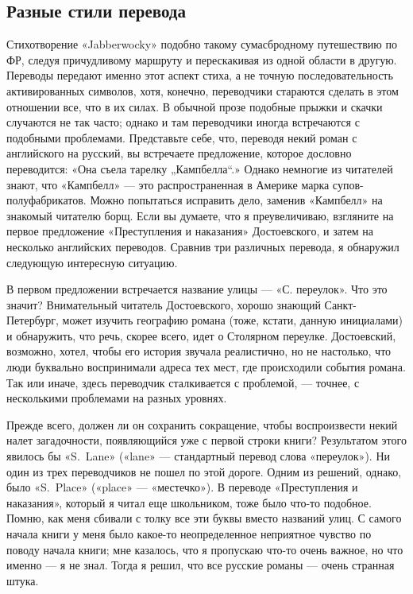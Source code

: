 \documentclass[../main.tex]{subfiles}
\begin{document}
\subsection{Разные стили перевода}

Стихотворение «Jabberwocky» подобно такому сумасбродному путешествию по ФР, следуя причудливому маршруту и перескакивая из одной области в другую. Переводы передают именно этот аспект стиха, а не точную последовательность активированных символов, хотя, конечно, переводчики стараются сделать в этом отношении все, что в их силах. В обычной прозе подобные прыжки и скачки случаются не так часто; однако и там переводчики иногда встречаются с подобными проблемами. Представьте себе, что, переводя некий роман с английского на русский, вы встречаете предложение, которое дословно переводится: «Она съела тарелку „Кампбелла``.» Однако немногие из читателей знают, что «Кампбелл» --- это распространенная в Америке марка супов-полуфабрикатов. Можно попытаться исправить дело, заменив «Кампбелл» на знакомый читателю борщ. Если вы думаете, что я преувеличиваю, взгляните на первое предложение «Преступления и наказания» Достоевского, и затем на несколько английских переводов. Сравнив три различных перевода, я обнаружил следующую интересную ситуацию.

В первом предложении встречается название улицы --- «С. переулок». Что это значит? Внимательный читатель Достоевского, хорошо знающий Санкт-Петербург, может изучить географию романа (тоже, кстати, данную инициалами) и обнаружить, что речь, скорее всего, идет о Столярном переулке. Достоевский, возможно, хотел, чтобы его история звучала реалистично, но не настолько, что люди буквально воспринимали адреса тех мест, где происходили события романа. Так или иначе, здесь переводчик сталкивается с проблемой, --- точнее, с несколькими проблемами на разных уровнях.

Прежде всего, должен ли он сохранить сокращение, чтобы воспроизвести некий налет загадочности, появляющийся уже с первой строки книги? Результатом этого явилось бы «S.~Lane» («lane» --- стандартный перевод слова «переулок»). Ни один из трех переводчиков не пошел по этой дороге. Одним из решений, однако, было «S.~Place» («place» --- «местечко»). В переводе «Преступления и наказания», который я читал еще школьником, тоже было что-то подобное. Помню, как меня сбивали с толку все эти буквы вместо названий улиц. С самого начала книги у меня было какое-то неопределенное неприятное чувство по поводу начала книги; мне казалось, что я пропускаю что-то очень важное, но что именно --- я не знал. Тогда я решил, что все русские романы --- очень странная штука.
\end{document}
